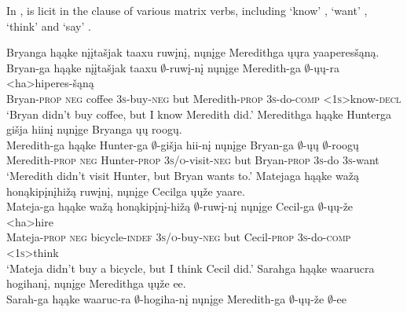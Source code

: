 \documentclass[output=paper]{LSP/langsci}
\begin{document}
In ,  is licit in the  clause of various matrix verbs, including `know' , `want' , `think'  and `say' .


 
\ea
\ea\label{ex:johnson:38a} 
\glll Bryanga hąąke {nįįtašjak taaxu} ruwįnį, nųnįge Meredithga ųųra yaaperesšąną.\\
Bryan-ga hąąke {nįįtašjak taaxu} $\emptyset$-ruwį-nį nųnįge Meredith-ga $\emptyset$-ųų-ra <ha>hiperes-šąną\\
Bryan-\textsc{prop} \textsc{neg} coffee \textsc{3s}-buy-\textsc{neg} but Meredith-\textsc{prop} \textsc{3s}-do-\textsc{comp} <\textsc{1s}>know-\textsc{decl}\\
\trans `Bryan didn't buy coffee, but I know Meredith did.'
\ex\label{ex:johnson:38b}
\glll Meredithga hąąke Hunterga {gišja hiinį} nųnįge Bryanga ųų roogų.\\
Meredith-ga hąąke Hunter-ga $\emptyset$-{gišja hii-nį} nųnįge Bryan-ga $\emptyset$-ųų $\emptyset$-roogų\\
Meredith-\textsc{prop} \textsc{neg} Hunter-\textsc{prop} \textsc{3s/o}-visit-\textsc{neg} but Bryan-\textsc{prop} \textsc{3s}-do \textsc{3s}-want\\
\trans `Meredith didn't visit Hunter, but Bryan wants to.'
\ex\label{ex:johnson:38c}
\glll Matejaga hąąke {wažą honąkipįnįhižą} ruwįnį, nųnįge Cecilga ųųže yaare.\\
Mateja-ga hąąke {wažą honąkipįnį-hižą} $\emptyset$-ruwį-nį nųnįge Cecil-ga $\emptyset$-ųų-že <ha>hire\\
Mateja-\textsc{prop} \textsc{neg} bicycle-\textsc{indef} \textsc{3s/o}-buy-\textsc{neg} but Cecil-\textsc{prop} \textsc{3s}-do-\textsc{comp} <\textsc{1s}>think\\
\trans `Mateja didn't buy a bicycle, but I think Cecil did.'
\ex\label{ex:johnson:38d}
\glll Sarahga hąąke waarucra hogihanį, nųnįge Meredithga ųųže ee.\\
Sarah-ga hąąke waaruc-ra $\emptyset$-hogiha-nį nųnįge Meredith-ga $\emptyset$-ųų-že $\emptyset$-ee\\
\end{document}
